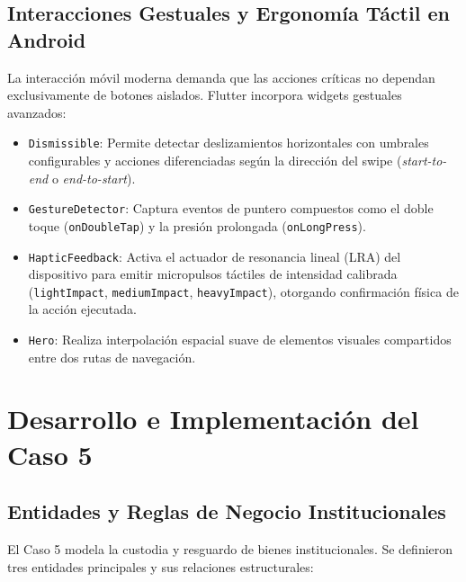 \documentclass[12pt,a4paper]{article}
\begin{document}
\subsection{Interacciones Gestuales y Ergonomía Táctil en Android}
La interacción móvil moderna demanda que las acciones críticas no dependan exclusivamente de botones aislados. Flutter incorpora widgets gestuales avanzados:
\begin{itemize}
    \item \texttt{Dismissible}: Permite detectar deslizamientos horizontales con umbrales configurables y acciones diferenciadas según la dirección del swipe (\textit{start-to-end} o \textit{end-to-start}).
    \item \texttt{GestureDetector}: Captura eventos de puntero compuestos como el doble toque (\texttt{onDoubleTap}) y la presión prolongada (\texttt{onLongPress}).
    \item \texttt{HapticFeedback}: Activa el actuador de resonancia lineal (LRA) del dispositivo para emitir micropulsos táctiles de intensidad calibrada (\texttt{lightImpact}, \texttt{mediumImpact}, \texttt{heavyImpact}), otorgando confirmación física de la acción ejecutada.
    \item \texttt{Hero}: Realiza interpolación espacial suave de elementos visuales compartidos entre dos rutas de navegación.
\end{itemize}

\section{Desarrollo e Implementación del Caso 5}

\subsection{Entidades y Reglas de Negocio Institucionales}
El Caso 5 modela la custodia y resguardo de bienes institucionales. Se definieron tres entidades principales y sus relaciones estructurales:
\end{document}
